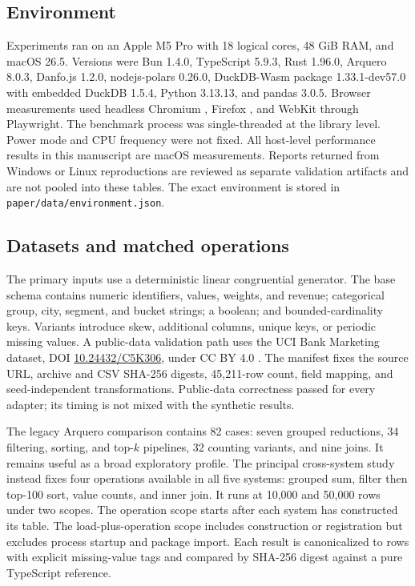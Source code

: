 \documentclass[pdflatex,sn-basic,Numbered]{sn-jnl}
\begin{document}
\subsection{Environment}

Experiments ran on an Apple M5 Pro with 18 logical cores, 48 GiB RAM, and macOS 26.5. Versions were Bun 1.4.0, TypeScript 5.9.3, Rust 1.96.0, Arquero 8.0.3, Danfo.js 1.2.0, nodejs-polars 0.26.0, DuckDB-Wasm package 1.33.1-dev57.0 with embedded DuckDB 1.5.4, Python 3.13.13, and pandas 3.0.5. Browser measurements used headless Chromium \ChromiumVersion{}, Firefox \FirefoxVersion{}, and WebKit \WebkitVersion{} through Playwright. The benchmark process was single-threaded at the library level. Power mode and CPU frequency were not fixed. All host-level performance results in this manuscript are macOS measurements. Reports returned from Windows or Linux reproductions are reviewed as separate validation artifacts and are not pooled into these tables. The exact environment is stored in \texttt{paper/data/environment.json}.

\subsection{Datasets and matched operations}

The primary inputs use a deterministic linear congruential generator. The base schema contains numeric identifiers, values, weights, and revenue; categorical group, city, segment, and bucket strings; a boolean; and bounded-cardinality keys. Variants introduce skew, additional columns, unique keys, or periodic missing values. A public-data validation path uses the UCI Bank Marketing dataset, DOI \href{https://doi.org/10.24432/C5K306}{10.24432/C5K306}, under CC BY 4.0 \cite{ucibank}. The manifest fixes the source URL, archive and CSV SHA-256 digests, 45,211-row count, field mapping, and seed-independent transformations. Public-data correctness passed for every adapter; its timing is not mixed with the synthetic results.

The legacy Arquero comparison contains 82 cases: seven grouped reductions, 34 filtering, sorting, and top-$k$ pipelines, 32 counting variants, and nine joins. It remains useful as a broad exploratory profile. The principal cross-system study instead fixes four operations available in all five systems: grouped sum, filter then top-100 sort, value counts, and inner join. It runs at 10,000 and 50,000 rows under two scopes. The operation scope starts after each system has constructed its table. The load-plus-operation scope includes construction or registration but excludes process startup and package import. Each result is canonicalized to rows with explicit missing-value tags and compared by SHA-256 digest against a pure TypeScript reference.
\end{document}
